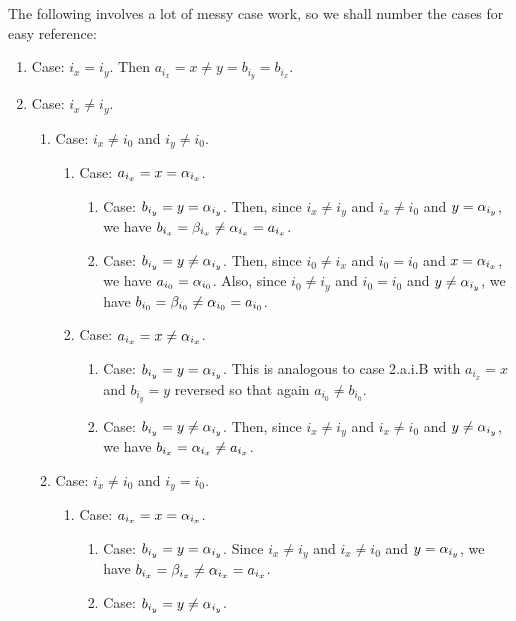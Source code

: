 {{    The following involves a lot of messy case work, so we shall number the cases for easy reference:
    \begin{enumerate}
    \item Case: $i_x = i_y$.
      Then $a_{i_x} = x \neq y = b_{i_y} = b_{i_x}$.
    \item Case: $i_x \neq i_y$.
      \begin{enumerate}
      \item Case: $i_x \neq i_0$ and $i_y \neq i_0$.
        \begin{enumerate}
        \item Case: $a_{i_x} = x = \alpha_{i_x}$.
          \begin{enumerate}
          \item Case: $b_{i_y} = y = \alpha_{i_y}$.
            Then, since $i_x \neq i_y$ and $i_x \neq i_0$ and $y = \alpha_{i_y}$, we have $b_{i_x} = \beta_{i_x} \neq \alpha_{i_x} = a_{i_x}$.
          \item Case: $b_{i_y} = y \neq \alpha_{i_y}$.
            Then, since $i_0 \neq i_x$ and $i_0 = i_0$ and $x = \alpha_{i_x}$, we have $a_{i_0} = \alpha_{i_0}$.
            Also, since $i_0 \neq i_y$ and $i_0 = i_0$ and $y \neq \alpha_{i_y}$, we have $b_{i_0} = \beta_{i_0} \neq \alpha_{i_0} = a_{i_0}$.
          \end{enumerate}
        \item Case: $a_{i_x} = x \neq \alpha_{i_x}$.
          \begin{enumerate}
          \item Case: $b_{i_y} = y = \alpha_{i_y}$.
            This is analogous to case 2.a.i.B with $a_{i_x} = x$ and $b_{i_y} = y$ reversed so that again $a_{i_0} \neq b_{i_0}$.
          \item Case: $b_{i_y} = y \neq \alpha_{i_y}$.
            Then, since $i_x \neq i_y$ and $i_x \neq i_0$ and $y \neq \alpha_{i_y}$, we have $b_{i_x} = \alpha_{i_x} \neq a_{i_x}$.
          \end{enumerate}
        \end{enumerate}
      \item Case: $i_x \neq i_0$ and $i_y = i_0$.
        \begin{enumerate}
        \item Case: $a_{i_x} = x = \alpha_{i_x}$.
          \begin{enumerate}
          \item Case: $b_{i_y} = y = \alpha_{i_y}$.
            Since $i_x \neq i_y$ and $i_x \neq i_0$ and $y = \alpha_{i_y}$, we have $b_{i_x} = \beta_{i_x} \neq \alpha_{i_x} = a_{i_x}$.
          \item Case: $b_{i_y} = y \neq \alpha_{i_y}$.

\end{enumerate}
\end{enumerate}
\end{enumerate}
\end{enumerate}}}
